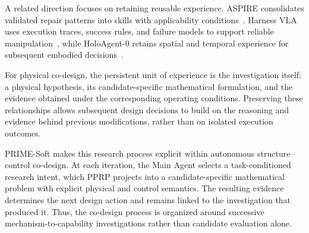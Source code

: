 A related direction focuses on retaining reusable experience. ASPIRE consolidates validated repair patterns into skills with applicability conditions~\cite{lu2026aspire}. Harness VLA uses execution traces, success rules, and failure models to support reliable manipulation~\cite{zhang2026harnessvla}, while HoloAgent-0 retains spatial and temporal experience for subsequent embodied decisions~\cite{zhou2026holoagent}.

For physical co-design, the persistent unit of experience is the investigation itself: a physical hypothesis, its candidate-specific mathematical formulation, and the evidence obtained under the corresponding operating conditions. Preserving these relationships allows subsequent design decisions to build on the reasoning and evidence behind previous modifications, rather than on isolated execution outcomes.

PRIME-Soft makes this research process explicit within autonomous structure--control co-design. At each iteration, the Main Agent selects a task-conditioned research intent, which PPRP projects into a candidate-specific mathematical problem with explicit physical and control semantics. The resulting evidence determines the next design action and remains linked to the investigation that produced it. Thus, the co-design process is organized around successive mechanism-to-capability investigations rather than candidate evaluation alone.
